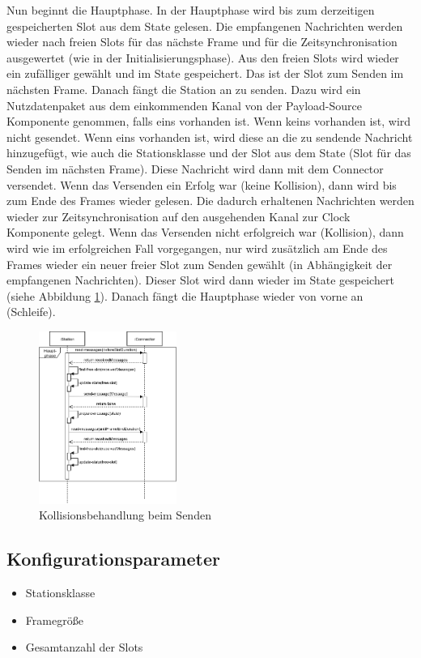 \documentclass[draft=false
              ,paper=a4
              ,twoside=false
              ,fontsize=11pt
              ,headsepline
              ,BCOR10mm
              ,DIV11
              ]{scrbook}
\begin{document}
Nun beginnt die Hauptphase. In der Hauptphase wird bis zum derzeitigen gespeicherten Slot aus dem State gelesen. Die empfangenen Nachrichten werden wieder nach freien Slots für das nächste Frame und für die Zeitsynchronisation ausgewertet (wie in der Initialisierungsphase). Aus den freien Slots wird wieder ein zufälliger gewählt und im State gespeichert. Das ist der Slot zum Senden im nächsten Frame.
Danach fängt die Station an zu senden. Dazu wird ein Nutzdatenpaket aus dem einkommenden Kanal von der Payload-Source Komponente genommen, falls eins vorhanden ist. Wenn keins vorhanden ist, wird nicht gesendet.
Wenn eins vorhanden ist, wird diese an die zu sendende Nachricht hinzugefügt, wie auch die Stationsklasse und der Slot aus dem State (Slot für das Senden im nächsten Frame).
Diese Nachricht wird dann mit dem Connector versendet.
Wenn das Versenden ein Erfolg war (keine Kollision), dann wird bis zum Ende des Frames wieder gelesen. Die dadurch erhaltenen Nachrichten werden wieder zur Zeitsynchronisation auf den ausgehenden Kanal zur Clock Komponente gelegt.
Wenn das Versenden nicht erfolgreich war (Kollision), dann wird wie im erfolgreichen Fall vorgegangen, nur wird zusätzlich am Ende des Frames wieder ein neuer freier Slot zum Senden gewählt (in Abhängigkeit der empfangenen Nachrichten). Dieser Slot wird dann wieder im State gespeichert (siehe Abbildung \ref{fig:station-collision}).
Danach fängt die Hauptphase wieder von vorne an (Schleife).

\begin{figure}[h]
\centering
\includegraphics[width=0.4\textwidth]{station-collision.png}
\caption[station-collision]{Kollisionsbehandlung beim Senden}
\label{fig:station-collision}
\end{figure}

\subsection{Konfigurationsparameter}
\begin{itemize}
    \item Stationsklasse
    \item Framegröße
    \item Gesamtanzahl der Slots
\end{itemize}
\end{document}

